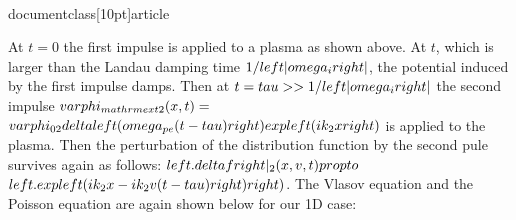 \\documentclass[10pt]{article}
\begin{document}
{{{{{At $t=0$ the first impulse is applied to a plasma as shown above. At $t$, which is larger than the Landau damping time $1 /\\left|\\omega_{i}\\right|$, the potential induced by the first impulse damps. Then at $t=\\tau>>1 /\\left|\\omega_{i}\\right|$ the second impulse $\\varphi_{\\mathrm{ext} 2}(x, t)=$ $\\varphi_{02} \\delta\\left(\\omega_{p e}(t-\\tau)\\right) \\exp \\left(i k_{2} x\\right)$ is applied to the plasma. Then the perturbation of the distribution function by the second pule survives again as follows: $\\left.\\delta f\\right|_{2}(x, v, t) \\propto$ $\\left.\\exp \\left(i k_{2} x-i k_{2} v(t-\\tau)\\right)\\right)$. The Vlasov equation and the Poisson equation are again shown below for our 1D case:

}}}}}
\end{document}
